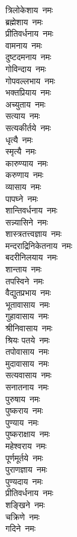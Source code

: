 \begin{multicols}{2}
\begin{flushleft}
त्रिलोकेशाय~नमः\\
ब्रह्मेशाय~नमः\\
प्रीतिवर्धनाय~नमः\\
वामनाय~नमः\\
दुष्टदमनाय~नमः\\
गोविन्दाय~नमः\\
गोपवल्लभाय~नमः\\
भक्तप्रियाय~नमः\\
अच्युताय~नमः\hfill{}\\
सत्याय~नमः\\
सत्यकीर्तये~नमः\\
धृत्यै~नमः\\
स्मृत्यै~नमः\\
कारुण्याय~नमः\\
करुणाय~नमः\\
व्यासाय~नमः\\
पापघ्ने~नमः\\
शान्तिवर्धनाय~नमः\\
सन्न्यासिने~नमः\hfill{}\\
शास्त्रतत्त्वज्ञाय~नमः\\
मन्दराद्रिनिकेतनाय~नमः\\
बदरीनिलयाय~नमः\\
शान्ताय~नमः\\
तपस्विने~नमः\\
वैद्युतप्रभाय~नमः\\
भूतावासाय~नमः\\
गुहावासाय~नमः\\
श्रीनिवासाय~नमः\\
श्रियः पतये~नमः\hfill{}\\
तपोवासाय~नमः\\
मुदावासाय~नमः\\
सत्यवासाय~नमः\\
सनातनाय~नमः\\
पुरुषाय~नमः\\
पुष्कराय~नमः\\
पुण्याय~नमः\\
पुष्कराक्षाय~नमः\\
महेश्वराय~नमः\\
पूर्णमूर्तये~नमः\hfill{}\\
पुराणज्ञाय~नमः\\
पुण्यदाय~नमः\\
प्रीतिवर्धनाय~नमः\\
शङ्खिने~नमः\\
चक्रिणे~नमः\\
गदिने~नमः\\

\end{flushleft}
\end{multicols}

